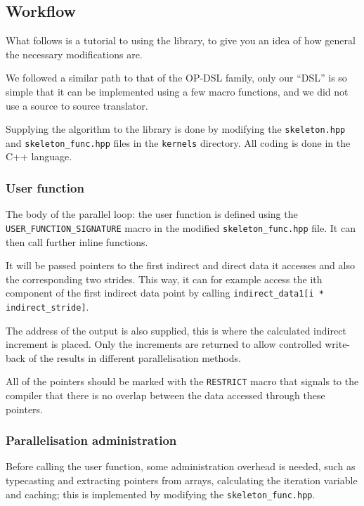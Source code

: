 \subsection{Workflow}

What follows is a tutorial to using the library, to give you an idea of how
general the necessary modifications are.

We followed a similar path to that of the OP-DSL family, only our ``DSL'' is so
simple that it can be implemented using a few macro functions, and we did not
use a source to source translator.

Supplying the algorithm to the library is done by modifying the
\texttt{skeleton.hpp} and \texttt{skeleton\_func.hpp} files in the
\texttt{kernels} directory. All coding is done in the C++ language.

\subsubsection{User function}

The body of the parallel loop: the user function is defined using the
\lstinline!USER_FUNCTION_SIGNATURE! macro in the modified
\texttt{skeleton\_func.hpp} file. It can then call further inline functions.

It will be passed pointers to the first indirect and direct data it accesses and
also the corresponding two strides. This way, it can for example access the ith
component of the first indirect data point by calling
\lstinline!indirect_data1[i * indirect_stride]!.

The address of the output is also supplied, this is where the calculated
indirect increment is placed. Only the increments are returned to allow
controlled write-back of the results in different parallelisation methods.

All of the pointers should be marked with the \lstinline!RESTRICT! macro that
signals to the compiler that there is no overlap between the data accessed
through these pointers.

\subsubsection{Parallelisation administration}

Before calling the user function, some administration overhead is needed, such
as typecasting and extracting pointers from arrays, calculating the iteration
variable and caching; this is implemented by modifying the
\texttt{skeleton\_func.hpp}.

